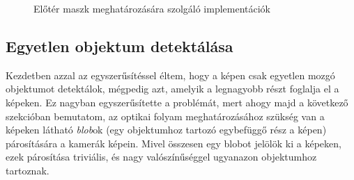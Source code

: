 \begin{figure}[tbh]
\centering


\caption{Előtér maszk meghatározására szolgáló implementációk \label{fig:cd:fg-mask-calc}}
\end{figure}

\subsection{Egyetlen objektum detektálása}

Kezdetben azzal az egyszerűsítéssel éltem, hogy a képen csak egyetlen mozgó objektumot detektálok, mégpedig azt, amelyik a legnagyobb részt foglalja el a képeken. Ez nagyban egyszerűsítette a problémát, mert ahogy majd a következő szekcióban bemutatom, az optikai folyam meghatározásához szükség van a képeken látható \textit{blob}ok (egy objektumhoz tartozó egybefüggő rész a képen) párosítására a kamerák képein. Mivel összesen egy blobot jelölök ki a képeken, ezek párosítása triviális, és nagy valószínűséggel ugyanazon objektumhoz tartoznak.

